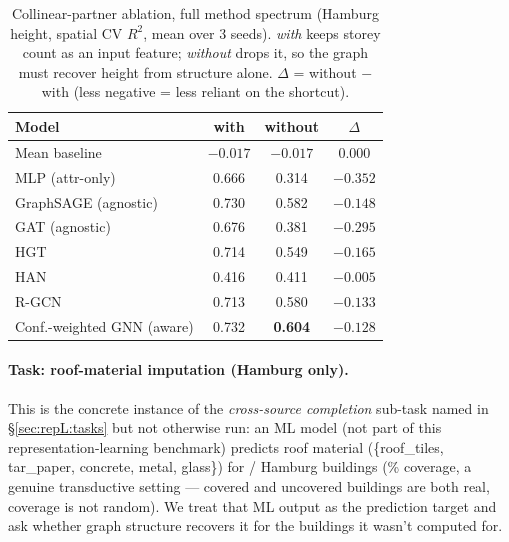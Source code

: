 \begin{table}[t]
  \centering
  \caption{Collinear-partner ablation, full method spectrum (Hamburg height,
  spatial CV $R^2$, mean over 3 seeds). \emph{with} keeps storey count as an
  input feature; \emph{without} drops it, so the graph must recover height
  from structure alone. $\Delta$ = without $-$ with (less negative = less
  reliant on the shortcut).}
  \label{tab:repL-ablation}
  \small\setlength{\tabcolsep}{4pt}
  \begin{tabular}{@{}lccc@{}}
    \toprule
    Model & with & without & $\Delta$\\
    \midrule
    Mean baseline                & $-0.017$ & $-0.017$ & $0.000$\\
    MLP (attr-only)              & 0.666 & 0.314 & $-0.352$\\
    GraphSAGE (agnostic)         & 0.730 & 0.582 & $-0.148$\\
    GAT (agnostic)               & 0.676 & 0.381 & $-0.295$\\
    HGT                          & 0.714 & 0.549 & $-0.165$\\
    HAN                          & 0.416 & 0.411 & $\mathbf{-0.005}$\\
    R-GCN                        & 0.713 & 0.580 & $-0.133$\\
    Conf.-weighted GNN (aware)   & 0.732 & \textbf{0.604} & $-0.128$\\
    \bottomrule
  \end{tabular}
\end{table}

\paragraph{Task: roof-material imputation (Hamburg only).} This is the
concrete instance of the \emph{cross-source completion} sub-task named in
\S\ref{sec:repL:tasks} but not otherwise run: an ML model (not part of this
representation-learning benchmark) predicts roof material
(\{roof\_tiles, tar\_paper, concrete, metal, glass\}) for
/ Hamburg buildings (\% coverage, a
genuine transductive setting --- covered and uncovered buildings are both
real, coverage is not random). We treat that ML output as the prediction
target and ask whether graph structure recovers it for the buildings it
wasn't computed for.

